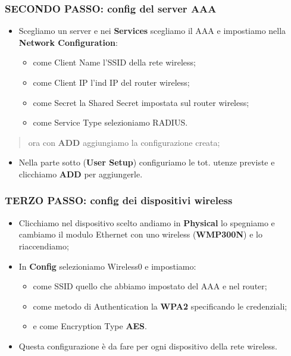 \subsubsection{\texorpdfstring{\textbf{SECONDO PASSO: config del server
AAA}}{SECONDO PASSO: config del server AAA}}\label{secondo-passo-config-del-server-aaa}

\begin{itemize}
\item
  Scegliamo un server e nei \textbf{Services} scegliamo il AAA e
  impostiamo nella \textbf{Network Configuration}:

  \begin{itemize}
  \item
    come Client Name l'SSID della rete wireless;
  \item
    come Client IP l'ind IP del router wireless;
  \item
    come Secret la Shared Secret impostata sul router wireless;
  \item
    come Service Type selezioniamo RADIUS.
  \end{itemize}
\end{itemize}

\begin{quote}
ora con \textbf{ADD} aggiungiamo la configurazione creata;
\end{quote}

\begin{itemize}
\item
  Nella parte sotto (\textbf{User Setup}) configuriamo le tot. utenze
  previste e clicchiamo \textbf{ADD} per aggiungerle.
\end{itemize}

\hl{}

\subsubsection{\texorpdfstring{\textbf{TERZO PASSO: config dei
dispositivi
wireless}}{TERZO PASSO: config dei dispositivi wireless}}\label{terzo-passo-config-dei-dispositivi-wireless}

\begin{itemize}
\item
  Clicchiamo nel dispositivo scelto andiamo in \textbf{Physical} lo
  spegniamo e cambiamo il modulo Ethernet con uno wireless
  (\textbf{WMP300N}) e lo riaccendiamo;
\item
  In \textbf{Config} selezioniamo Wireless0 e impostiamo:

  \begin{itemize}
  \item
    come SSID quello che abbiamo impostato del AAA e nel router;
  \item
    come metodo di Authentication la \textbf{WPA2} specificando le
    credenziali;
  \item
    e come Encryption Type \textbf{AES}.
  \end{itemize}
\item
  Questa configurazione è da fare per ogni dispositivo della rete
  wireless.
\end{itemize}


